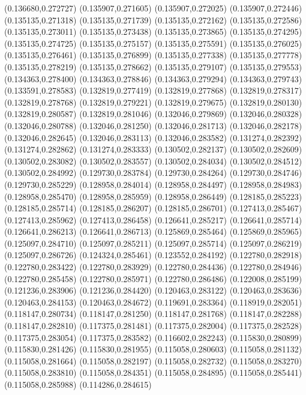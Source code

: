 (0.136680,0.272727)
(0.135907,0.271605)
(0.135907,0.272025)
(0.135907,0.272446)
(0.135135,0.271318)
(0.135135,0.271739)
(0.135135,0.272162)
(0.135135,0.272586)
(0.135135,0.273011)
(0.135135,0.273438)
(0.135135,0.273865)
(0.135135,0.274295)
(0.135135,0.274725)
(0.135135,0.275157)
(0.135135,0.275591)
(0.135135,0.276025)
(0.135135,0.276461)
(0.135135,0.276899)
(0.135135,0.277338)
(0.135135,0.277778)
(0.135135,0.278219)
(0.135135,0.278662)
(0.135135,0.279107)
(0.135135,0.279553)
(0.134363,0.278400)
(0.134363,0.278846)
(0.134363,0.279294)
(0.134363,0.279743)
(0.133591,0.278583)
(0.132819,0.277419)
(0.132819,0.277868)
(0.132819,0.278317)
(0.132819,0.278768)
(0.132819,0.279221)
(0.132819,0.279675)
(0.132819,0.280130)
(0.132819,0.280587)
(0.132819,0.281046)
(0.132046,0.279869)
(0.132046,0.280328)
(0.132046,0.280788)
(0.132046,0.281250)
(0.132046,0.281713)
(0.132046,0.282178)
(0.132046,0.282645)
(0.132046,0.283113)
(0.132046,0.283582)
(0.131274,0.282392)
(0.131274,0.282862)
(0.131274,0.283333)
(0.130502,0.282137)
(0.130502,0.282609)
(0.130502,0.283082)
(0.130502,0.283557)
(0.130502,0.284034)
(0.130502,0.284512)
(0.130502,0.284992)
(0.129730,0.283784)
(0.129730,0.284264)
(0.129730,0.284746)
(0.129730,0.285229)
(0.128958,0.284014)
(0.128958,0.284497)
(0.128958,0.284983)
(0.128958,0.285470)
(0.128958,0.285959)
(0.128958,0.286449)
(0.128185,0.285223)
(0.128185,0.285714)
(0.128185,0.286207)
(0.128185,0.286701)
(0.127413,0.285467)
(0.127413,0.285962)
(0.127413,0.286458)
(0.126641,0.285217)
(0.126641,0.285714)
(0.126641,0.286213)
(0.126641,0.286713)
(0.125869,0.285464)
(0.125869,0.285965)
(0.125097,0.284710)
(0.125097,0.285211)
(0.125097,0.285714)
(0.125097,0.286219)
(0.125097,0.286726)
(0.124324,0.285461)
(0.123552,0.284192)
(0.122780,0.282918)
(0.122780,0.283422)
(0.122780,0.283929)
(0.122780,0.284436)
(0.122780,0.284946)
(0.122780,0.285458)
(0.122780,0.285971)
(0.122780,0.286486)
(0.122008,0.285199)
(0.121236,0.283906)
(0.121236,0.284420)
(0.120463,0.283122)
(0.120463,0.283636)
(0.120463,0.284153)
(0.120463,0.284672)
(0.119691,0.283364)
(0.118919,0.282051)
(0.118147,0.280734)
(0.118147,0.281250)
(0.118147,0.281768)
(0.118147,0.282288)
(0.118147,0.282810)
(0.117375,0.281481)
(0.117375,0.282004)
(0.117375,0.282528)
(0.117375,0.283054)
(0.117375,0.283582)
(0.116602,0.282243)
(0.115830,0.280899)
(0.115830,0.281426)
(0.115830,0.281955)
(0.115058,0.280603)
(0.115058,0.281132)
(0.115058,0.281664)
(0.115058,0.282197)
(0.115058,0.282732)
(0.115058,0.283270)
(0.115058,0.283810)
(0.115058,0.284351)
(0.115058,0.284895)
(0.115058,0.285441)
(0.115058,0.285988)
(0.114286,0.284615)
